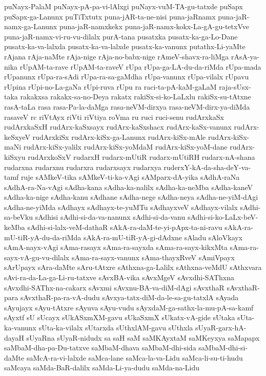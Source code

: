 {puNayx-PalaM
puNayx-pA-pa-vi-lAlxgi
puNayx-vuM-TA-gu-tatxde
puSapx
puSapx-ga-Lanunx
puTiTxtutx
puna-jAR-ta-ne-nisi
puna-jaRnamx
puna-jaR-namx-ga-Lanunx
puna-jaR-namxkekx
puna-jaR-namx-kokx-La-gA-gu-tetxVve
puna-jaR-namx-vi-ru-vu-dilalx
purA-tana
pusatxka
pusatx-ka-ga-Lo-Dane
pusatx-ka-va-lalxda
pusatx-ka-va-lalxde
pusatx-ka-vanunx
putathx-Li-yaMte
rAjana
rAja-naMte
rAja-nige
rAja-no-babx-nige
rAmeV-shavx-ra-liMga
rAsA-ya-nika
rUpAM-ta-rave
rUpAM-ta-raveV
rUpa
rUpa-ga-LA-du-da-riMda
rUpa-mada
rUpanunx
rUpa-ra-sAdi
rUpa-ra-sa-gaMdha
rUpa-vanunx
rUpa-vilalx
rUpavu
rUpina
rUpi-no-La-gaNa
rUpi-ruva
rUpu
ra
raci-ta-pA-kaM-gaLaM
raja-sUsx-taka
rakakxsa
rakakx-sa-no-Deya
rakatx
rakiSx-si-ko-LaLxlu
rakiSx-su-tAtxne
rasA-taLa
rasa
rasa-Pa-la-daMga
rasa-neVM-dirxya
rasa-neVM-dirx-ya-diMda
rasaveV
rc
riVtAyx
riVti
riVtiya
roVma
ru
ruci
ruci-senu
rudArxkaSx
rudArxkaSxH
rudArx-kaSxsayx
rudArx-kaSxshacx
rudArx-kaSx-vanunx
rudArx-keSxyeV
rudArxkiSx
rudArx-kiSx-ga-Lanunx
rudArx-kiSx-mAle
rudArx-kiSx-maNi
rudArx-kiSx-yalilx
rudArx-kiSx-yoMdaM
rudArx-kiSx-yoM-dane
rudArx-kiSxyu
rudArxkoSxV
rudarxH
rudarx-mUtiR
rudarx-mUtiRH
rudarx-nA-shana
rudarxna
rudarxnu
rudarxra
rudarxsayx
rudarxya
ruderxY-kA-da-sha-deY-va-tamf
ruje
sAMkeV-tika
sAMkeV-ti-ka-vAgi
sAMparx-dA-yika
sAdhA-raNa
sAdhA-ra-Na-vAgi
sAdha-kana
sAdha-ka-nalilx
sAdha-ka-neMba
sAdha-kaneV
sAdha-ka-nige
sAdha-kanu
sAdhane
sAdha-nege
sAdha-neya
sAdha-ne-yiM-dAgi
sAdha-ne-yiMda
sAdhayx
sAdhayx-te-yuMTu
sAdhayxveV
sAdhayx-vilalx
sAdhi-sa-beVku
sAdhisi
sAdhi-si-da-va-nanunx
sAdhi-si-da-vanu
sAdhi-si-ko-LaLx-beV-keMba
sAdhi-si-lalx-veM-dathaR
sAkA-ra-daM-te-yi-pApx-ta-ni-ravu
sAkA-ra-mU-tiR-yA-du-da-riMda
sAkA-ra-mU-tiR-yA-gi-dAdxne
sAladu
sAloVkayx
sAmA-nayx-vAgi
sAma-rasayx
sAma-ra-sayxda
sAma-ra-sayx-kikxMta
sAma-ra-sayx-vA-gu-vu-dilalx
sAma-ra-sayx-vanunx
sAma-thayxRveV
sAmiVpayx
sArUpayx
sAra-daMte
sAru-tAtxre
sAthxna-ga-Lalilx
sAthxna-veMdU
sAthxvara
sAvi-ra-da-La-ga-Li-ru-tatxve
sAvxBA-vika
sAvxMgeV
sAvxdhi-SAThxna
sAvxdhi-SAThx-na-cakarx
sAvxmi
sAvxnu-BA-va-diM-dAgi
sAvxthaR
sAvxthaR-para
sAvxthaR-pa-ra-vA-dudu
sAvxya-tatx-diM-da-le-sa-gu-tatxlA
sAyada
sAyujayx
sAyu-tAtxre
sAyuva
sAyu-vudu
sAyxdaM-ga-sathx-la-mu-pA-sa-kamf
sAyxtf
sU
sUcayx
sUkASxmXM-gavu
sUkaSxmX
sUkatx-vA-gide
sUtaka
sUta-ka-vanunx
sUta-ka-vilalx
sUtarxda
sUthxlAM-gavu
sUthxla
sUyaR-garx-hA-dayaH
sUyaRna
sUyaR-nidudx
sa
saH
saM
saMKAyxtaM
saMKeyxya
saMapapx
saMbaM-dha-pa-Du-tatxve
saMbaM-dhava
saMbaM-dhi-sida
saMbaM-dhi-si-daMte
saMcA-ra-vi-lalxde
saMca-lane
saMca-la-va-Lidu
saMca-li-su-ti-hudu
saMcaya
saMda-BaR-dalilx
saMda-Li-ya-dudu
saMda-na-Lidu
}

